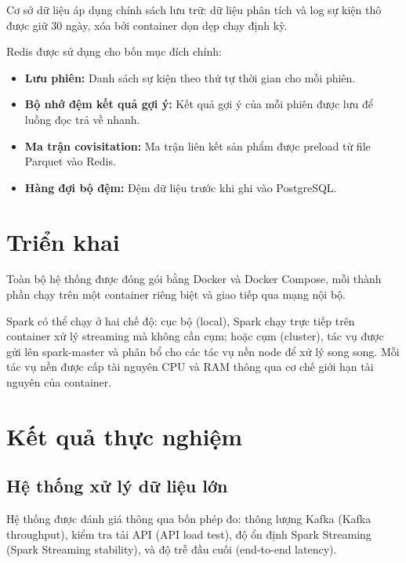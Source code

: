 \documentclass[../BTL.tex]{subfiles}
\begin{document}
Cơ sở dữ liệu áp dụng chính sách lưu trữ: dữ liệu phân tích và log sự kiện thô được giữ 30 ngày, xóa bởi container dọn dẹp chạy định kỳ.

Redis được sử dụng cho bốn mục đích chính:
\begin{itemize}
    \item \textbf{Lưu phiên:} Danh sách sự kiện theo thứ tự thời gian cho mỗi phiên.
    \item \textbf{Bộ nhớ đệm kết quả gợi ý:} Kết quả gợi ý của mỗi phiên được lưu để luồng đọc trả về nhanh.
    \item \textbf{Ma trận covisitation:} Ma trận liên kết sản phẩm được preload từ file Parquet vào Redis.
    \item \textbf{Hàng đợi bộ đệm:} Đệm dữ liệu trước khi ghi vào PostgreSQL.
\end{itemize}

\section{Triển khai}
Toàn bộ hệ thống được đóng gói bằng Docker và Docker Compose, mỗi thành phần chạy trên một container riêng biệt và giao tiếp qua mạng nội bộ.

Spark có thể chạy ở hai chế độ: cục bộ (local), Spark chạy trực tiếp trên container xử lý streaming mà không cần cụm; hoặc cụm (cluster), tác vụ được gửi lên spark-master và phân bổ cho các tác vụ nền node để xử lý song song. Mỗi tác vụ nền được cấp tài nguyên CPU và RAM thông qua cơ chế giới hạn tài nguyên của container.


\section{Kết quả thực nghiệm}

\subsection{Hệ thống xử lý dữ liệu lớn}
Hệ thống được đánh giá thông qua bốn phép đo: thông lượng Kafka (Kafka throughput), kiểm tra tải API (API load test), độ ổn định Spark Streaming (Spark Streaming stability), và độ trễ đầu cuối (end-to-end latency).
\end{document}
